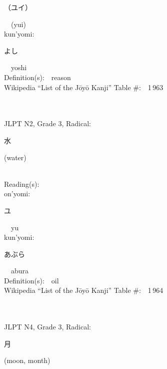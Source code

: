 \begin{multicols}{2}
{\hspace*{2em}}{\begin{CJK}{UTF8}{min} （ユイ） \end{CJK}}\ \ (yui)\ \ \\
{\hspace*{1em}}kun'yomi:\ \ \\
{\hspace*{2em}}{\begin{CJK}{UTF8}{min} よし \end{CJK}}\ \ yoshi\ \ \\
Definition(s):\ \ reason \\
Wikipedia ``List of the J\=oy\=o Kanji'' Table \#:\ \ 1\,963 \\
\ \ \\
{\fontsize{34pt}{40pt}  }\ \ \\  %
{JLPT N2, Grade 3, Radical:\ \ {\begin{CJK}{UTF8}{min} 水 \end{CJK}} (water) } \\
Reading(s):\ \ \\
{\hspace*{1em}}on'yomi:\ \ \\
{\hspace*{2em}}{\begin{CJK}{UTF8}{min} ユ \end{CJK}}\ \ yu\ \ \\
{\hspace*{1em}}kun'yomi:\ \ \\
{\hspace*{2em}}{\begin{CJK}{UTF8}{min} あぶら \end{CJK}}\ \ abura\ \ \\
Definition(s):\ \ oil \\
Wikipedia ``List of the J\=oy\=o Kanji'' Table \#:\ \ 1\,964 \\
\ \ \\
{\fontsize{34pt}{40pt}  }\ \ \\  %
{JLPT N4, Grade 3, Radical:\ \ {\begin{CJK}{UTF8}{min} 月 \end{CJK}} (moon, month) } \\

\end{multicols}
